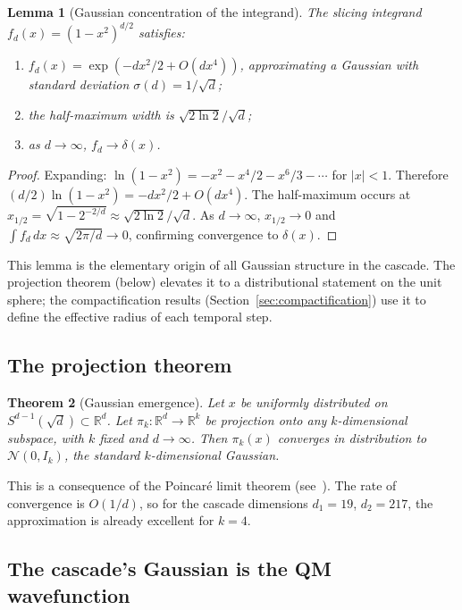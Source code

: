 \documentclass[12pt,a4paper]{article}
\newtheorem{theorem}{Theorem}[section]
\newtheorem{lemma}[theorem]{Lemma}
\begin{document}
\begin{lemma}[Gaussian concentration of the integrand]\label{lem:gaussian}
The slicing integrand $f_d(x) = (1-x^2)^{d/2}$ satisfies:
\begin{enumerate}
\item[(a)] $f_d(x) = \exp(-dx^2/2 + O(dx^4))$, approximating a Gaussian with standard
deviation $\sigma(d) = 1/\sqrt{d}$;
\item[(b)] the half-maximum width is $\sqrt{2\ln 2}/\sqrt{d}$;
\item[(c)] as $d\to\infty$, $f_d\to\delta(x)$.
\end{enumerate}
\end{lemma}
\begin{proof}
Expanding: $\ln(1-x^2) = -x^2 - x^4/2 - x^6/3 - \cdots$ for $|x|<1$. Therefore
$(d/2)\ln(1-x^2) = -dx^2/2 + O(dx^4)$. The half-maximum occurs at
$x_{1/2} = \sqrt{1-2^{-2/d}} \approx \sqrt{2\ln 2}/\sqrt{d}$.
As $d\to\infty$, $x_{1/2}\to 0$ and $\int f_d\,dx \approx \sqrt{2\pi/d}\to 0$,
confirming convergence to $\delta(x)$.
\end{proof}

This lemma is the elementary origin of all Gaussian structure in the cascade. The
projection theorem (below) elevates it to a distributional statement on the unit
sphere; the compactification results (Section~\ref{sec:compactification}) use it to
define the effective radius of each temporal step.

\subsection{The projection theorem}

\begin{theorem}[Gaussian emergence]\label{thm:gaussian}
Let $x$ be uniformly distributed on $S^{d-1}(\sqrt{d})\subset\mathbb{R}^d$. Let
$\pi_k:\mathbb{R}^d\to\mathbb{R}^k$ be projection onto any $k$-dimensional subspace, with
$k$ fixed and $d\to\infty$. Then $\pi_k(x)$ converges in distribution to
$\mathcal{N}(0,I_k)$, the standard $k$-dimensional Gaussian.
\end{theorem}

This is a consequence of the Poincar\'{e} limit theorem (see~\cite{ledoux,milman}). The
rate of convergence is $O(1/d)$, so for the cascade dimensions $d_1=19$, $d_2=217$, the
approximation is already excellent for $k=4$.

\subsection{The cascade's Gaussian is the QM wavefunction}
\end{document}
